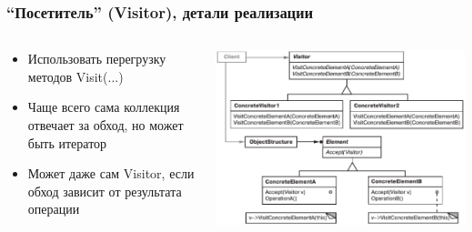 \documentclass[xetex,mathserif,serif]{beamer}
\begin{document}
	\begin{frame}
		\frametitle{``Посетитель'' (Visitor), детали реализации}
		\begin{columns}
			\begin{column}{0.5\textwidth}
				\begin{itemize}
					\item Использовать перегрузку методов Visit(...)
					\item Чаще всего сама коллекция отвечает за обход, но может быть итератор
					\item Может даже сам Visitor, если обход зависит от результата операции
				\end{itemize}
			\end{column}
			\begin{column}{0.5\textwidth}
				\begin{center}
					\includegraphics[width=\textwidth]{visitor.png}
				\end{center}
			\end{column}
		\end{columns}
	\end{frame}

\end{document}
